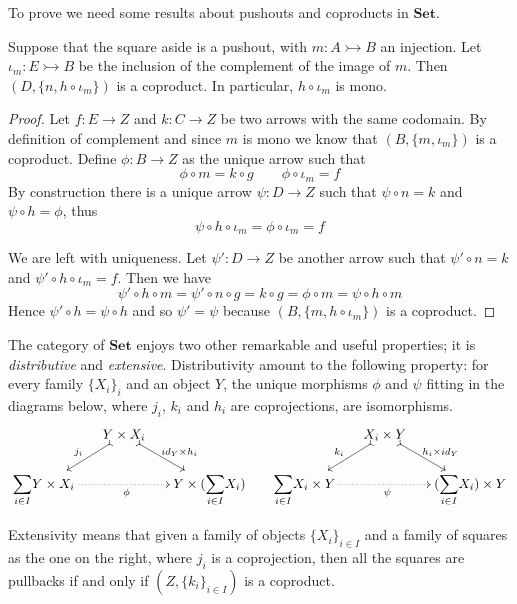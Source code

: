 \documentclass[a4paper,UKenglish,cleveref,pdftex,thm-restate,numberwithinsect]{lipics-v2021}
\newcommand{\Set}{\mathbf{Set}}
\newcommand{\Sum}{\mathlarger{\sum}}
\newcommand{\mto}{\rightarrowtail}
\newcommand{\id}[1]{\mathsf{id}_{#1}}
\begin{document}
To prove  we need some results about pushouts and coproducts in $\Set$.

\noindent 
		\parbox{11.7cm}{
\begin{lemma}\label{lem:po_set}
Suppose that the square aside is a pushout, with $m\colon A\mto B$ an injection. Let $\iota_{m}\colon E\mto B$ be the inclusion of the complement of the image of $m$. Then $(D, \{n, h\circ \iota_m \})$ is a coproduct. In particular, $h\circ \iota_m$ is mono.
\end{lemma}}\hfill \parbox{2cm}{\vspace{0cm}}
\begin{proof}
		 Let $f\colon E\to Z$ and $k\colon C\to Z$ be two arrows with the same codomain. By definition of complement and since $m$ is mono we know that $(B, \{m, \iota_m\})$ is a coproduct. Define $\phi\colon B\to Z$ as the unique arrow such that \[\phi\circ m=k\circ g \qquad \phi \circ \iota_m=f\] 
		By construction there is a unique arrow $\psi \colon D\to Z$ such that $\psi \circ n=k$ and $\psi \circ h=\phi$, thus 
		\[
		\psi \circ h\circ \iota_m =\phi \circ \iota_m=f\]
		
We are left with uniqueness. Let $\psi'\colon D\to Z$ be another arrow such that $\psi' \circ n=k$ and $\psi' \circ h\circ \iota_m=f$. Then we have
		\[\psi'\circ h\circ m=\psi'\circ n\circ g=k\circ g=\phi \circ m =\psi \circ h\circ m \]
		Hence $\psi'\circ h=\psi \circ h$ and so $\psi'=\psi$ because $(B, \{m, h\circ\iota_m \})$ is a coproduct. 
\end{proof}



The category of $\Set$ enjoys two other remarkable and useful properties; it is \emph{distributive} and \emph{extensive}. Distributivity amount to the following property: for every family $\{X_i\}_{i}$ and an object $Y$, the unique morphisms $\phi$ and $\psi $ fitting in the diagrams below, where $j_i$, $k_i$ and $h_i$ are coprojections, are isomorphisms.
\[\xymatrix@C=15pt@R=15pt{&Y\times X_i \ar@{>->}[dl]_{j_i} \ar@{>->}[dr]^{\id{Y}\times h_i} &&&X_i \times Y \ar@{>->}[dl]_{k_i} \ar@{>->}[dr]^{ h_i \times \id{Y}} \\ \Sum_{i\in I} Y\times X_i \ar@{.>}[rr]_{\phi}&& Y\times (\Sum_{i\in I}X_i) & \Sum_{i\in I}  X_i \times Y \ar@{.>}[rr]_{\psi}&&  (\Sum_{i\in I}X_i) \times Y }\]

\noindent 
\parbox{11.5cm}{\hspace{15pt} Extensivity means that given a family of objects $\{X_{i}\}_{i\in I}$ and a family of squares as the one on the right, where $j_i$ is a  coprojection, then all the squares are pullbacks if and only if $(Z, \{k_i\}_{i\in I})$ is a coproduct.}\hfill 
\parbox{2cm}{}
\end{document}

